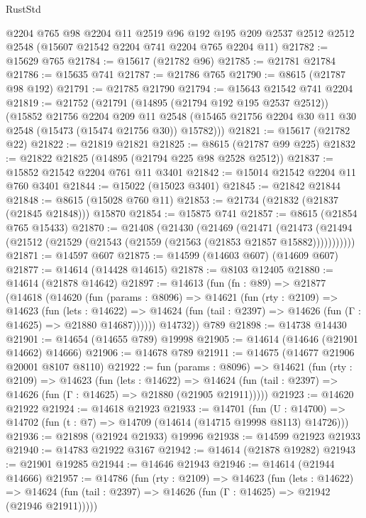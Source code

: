 \begin{lexlean}{RustStd}
\begin{coremodule}
    @2204
    @765
    @98
    @2204
    @11
    @2519
    @96
    @192
    @195
    @209
    @2537
    @2512
    @2512
    @2548
    (@15607 @21542 @2204 @741 @2204 @765 @2204 @11)
@21782 := @15629 @765
@21784 := @15617 (@21782 @96)
@21785 := @21781 @21784
@21786 := @15635 @741
@21787 := @21786 @765
@21790 := @8615 (@21787 @98 @192)
@21791 := @21785 @21790
@21794 := @15643 @21542 @741 @2204
@21819 := @21752
    (@21791
      (@14895 (@21794 @192 @195 @2537 @2512))
      (@15852
        @21756
        @2204
        @209
        @11
        @2548
        (@15465 @21756 @2204 @30 @11 @30 @2548 (@15473 (@15474 @21756 @30)) @15782)))
@21821 := @15617 (@21782 @22)
@21822 := @21819 @21821
@21825 := @8615 (@21787 @99 @225)
@21832 := @21822 @21825 (@14895 (@21794 @225 @98 @2528 @2512))
@21837 := @15852 @21542 @2204 @761 @11 @3401
@21842 := @15014 @21542 @2204 @11 @760 @3401
@21844 := @15022 (@15023 @3401)
@21845 := @21842 @21844
@21848 := @8615 (@15028 @760 @11)
@21853 := @21734 (@21832 (@21837 (@21845 @21848))) @15870
@21854 := @15875 @741
@21857 := @8615 (@21854 @765 @15433)
@21870 := @21408
    (@21430
      (@21469
        (@21471
          (@21473 (@21494 (@21512 (@21529 (@21543 (@21559 (@21563 (@21853 @21857 @15882)))))))))))
@21871 := @14597 @607
@21875 := @14599 (@14603 @607) (@14609 @607)
@21877 := @14614 (@14428 @14615)
@21878 := @8103 @12405
@21880 := @14614 (@21878 @14642)
@21897 := @14613
    (fun (fn : @89) =>
    @21877
      (@14618
        (@14620
          (fun (params : @8096) =>
          @14621
            (fun (rty : @2109) =>
            @14623
              (fun (lets : @14622) =>
              @14624 (fun (tail : @2397) => @14626 (fun (Γ : @14625) => @21880 @14687))))))
        @14732))
    @789
@21898 := @14738 @14430
@21901 := @14654 (@14655 @789) @19998
@21905 := @14614 (@14646 (@21901 @14662) @14666)
@21906 := @14678 @789
@21911 := @14675 (@14677 @21906 @20001 @8107 @8110)
@21922 := fun (params : @8096) =>
  @14621
    (fun (rty : @2109) =>
    @14623
      (fun (lets : @14622) =>
      @14624 (fun (tail : @2397) => @14626 (fun (Γ : @14625) => @21880 (@21905 @21911)))))
@21923 := @14620 @21922
@21924 := @14618 @21923
@21933 := @14701
    (fun (U : @14700) => @14702 (fun (t : @7) => @14709 (@14614 (@14715 @19998 @8113) @14726)))
@21936 := @21898 (@21924 @21933) @19996
@21938 := @14599 @21923 @21933
@21940 := @14783 @21922 @3167
@21942 := @14614 (@21878 @19282)
@21943 := @21901 @19285
@21944 := @14646 @21943
@21946 := @14614 (@21944 @14666)
@21957 := @14786
    (fun (rty : @2109) =>
    @14623
      (fun (lets : @14622) =>
      @14624 (fun (tail : @2397) => @14626 (fun (Γ : @14625) => @21942 (@21946 @21911)))))

\end{coremodule}
\end{lexlean}
